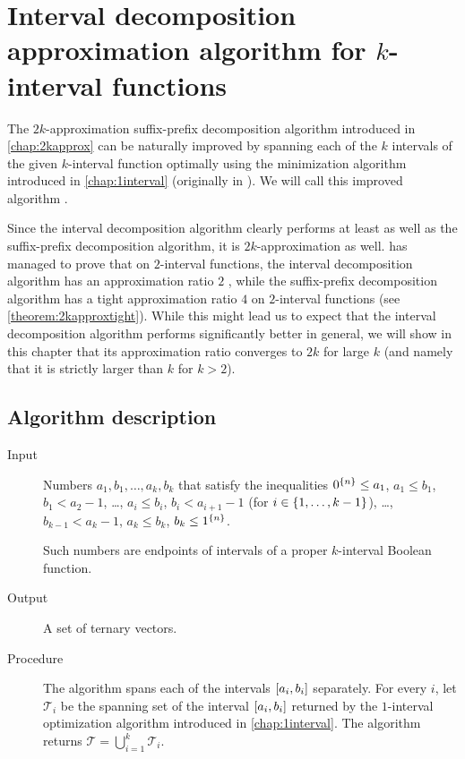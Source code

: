 \chapter{Interval decomposition approximation algorithm
for \texorpdfstring{$k$}{k}-interval functions}

The $2k$-approximation
suffix-prefix decomposition algorithm
introduced in \autoref{chap:2kapprox}
can be naturally improved
by spanning each of the $k$ intervals
of the given $k$-interval function
optimally using the minimization algorithm
introduced in \autoref{chap:1interval}
(originally in \citet{Schieber2005154}).
We will call this improved algorithm
.

Since the interval decomposition algorithm
clearly performs at least as well
as the suffix-prefix decomposition algorithm,
it is $2k$-approximation as well.
\citeauthor{Dubovsky2012} has managed
to prove that on $2$-interval functions,
the interval decomposition algorithm
has an approximation ratio $2$
\citep[p.~39]{Dubovsky2012}, %
while the suffix-prefix decomposition algorithm
has a tight approximation ratio $4$
on $2$-interval functions
(see \autoref{theorem:2kapproxtight}).
While this might lead us to expect
that the interval decomposition algorithm
performs significantly better in general,
we will show in this chapter that its approximation ratio
converges to $2k$ for large $k$
(and namely that it is strictly larger than $k$
for $k > 2$).

\section{Algorithm description}

\begin{description}
\item[Input] Numbers $a_1, b_1, \ldots, a_k, b_k$
that satisfy the inequalities
$0^{\{n\}} \leq a_1$,
$a_1 \leq b_1$,
$b_1 < a_2 - 1$,
\ldots,
$a_i \leq b_i$,
$b_i < a_{i+1} - 1$
(for $i \in \{1, \ldots, k-1\}$),
\ldots,
$b_{k-1} < a_k - 1$,
$a_k \leq b_k$,
$b_k \leq 1^{\{n\}}$.

Such numbers are endpoints of intervals
of a proper $k$-interval Boolean function.

\item[Output] A set of ternary vectors.

\item[Procedure]
The algorithm spans each of the intervals
$[a_i, b_i]$ separately.
For every $i$,
let $\mathcal{T}_i$ be the spanning set of the interval
$[a_i, b_i]$ returned by the $1$-interval
optimization algorithm
introduced in \autoref{chap:1interval}.
The algorithm returns
$\mathcal{T} = \bigcup_{i=1}^k{\mathcal{T}_i}$.
\end{description}

